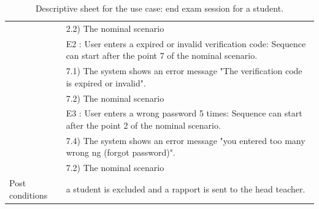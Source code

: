 \documentclass[]{uc2pfecaneva}
\begin{document}
\begin{table}[h]
\begin{tabularx}{\textwidth}{|l|X|}
            & \hspace{4mm}2.2) The nominal scenario                                                                                  \\
            & E2 : User enters a expired or invalid verification code: Sequence can start after the point 7 of the nominal scenario. \\
            & \hspace{4mm}7.1) The system shows an error message "The verification code is expired or invalid".                      \\
            & \hspace{4mm}7.2) The nominal scenario                                                                                  \\
            & E3 : User enters a wrong password 5 times: Sequence can start after the point 2 of the nominal scenario.               \\
            & \hspace{4mm}7.4) The system shows an error message "you entered too many wrong ng (forgot password)".                  \\
            & \hspace{4mm}7.2) The nominal scenario                                                                                  \\ \hline
            Post conditions
            & a student is excluded and a rapport is sent to the head teacher.                                                       \\ \hline
        \end{tabularx}
        \caption{Descriptive sheet for the use case: end exam session for a student.}
        \label{table:5}
    \end{table}
    \clearpage
\end{document}
